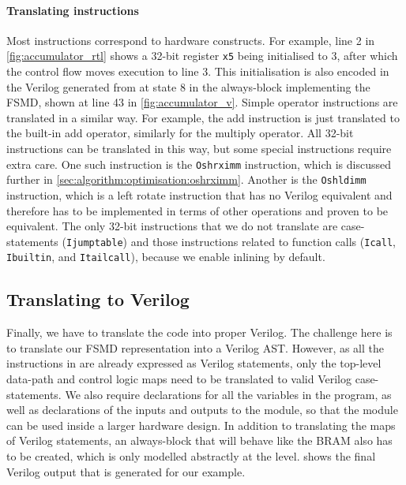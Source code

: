 \paragraph{Translating instructions}

Most \rtl{} instructions correspond to hardware constructs.  For example, line 2
in \cref{fig:accumulator_rtl} shows a 32-bit register \texttt{x5} being
initialised to 3, after which the control flow moves execution to line 3. This
initialisation is also encoded in the Verilog generated from \htl{} at state 8
in the always-block implementing the \gls{FSMD}, shown at line 43 in
\cref{fig:accumulator_v}.  Simple operator instructions are translated in a
similar way.  For example, the add instruction is just translated to the
built-in add operator, similarly for the multiply operator.  All 32-bit
instructions can be translated in this way, but some special instructions
require extra care. One such instruction is the \texttt{Oshrximm} instruction,
which is discussed further in
\cref{sec:algorithm:optimisation:oshrximm}. Another is the \texttt{Oshldimm}
instruction, which is a left rotate instruction that has no Verilog equivalent
and therefore has to be implemented in terms of other operations and proven to
be equivalent.  The only 32-bit instructions that we do not translate are
case-statements (\texttt{Ijumptable}) and those instructions related to function
calls (\texttt{Icall}, \texttt{Ibuiltin}, and \texttt{Itailcall}), because we
enable inlining by default.

\subsection{Translating \htl{} to Verilog}

Finally, we have to translate the \htl{} code into proper
Verilog. %
The challenge here is to translate our FSMD representation into a Verilog AST.
However, as all the instructions in \htl{} are already expressed as Verilog
statements, only the top-level data-path and control logic maps need to be
translated to valid Verilog case-statements.  We also require declarations for
all the variables in the program, as well as declarations of the inputs and
outputs to the module, so that the module can be used inside a larger hardware
design.  In addition to translating the maps of Verilog statements, an
always-block that will behave like the \gls{BRAM} also has to be created, which
is only modelled abstractly at the \htl{} level.   shows
the final Verilog output that is generated for our example.

